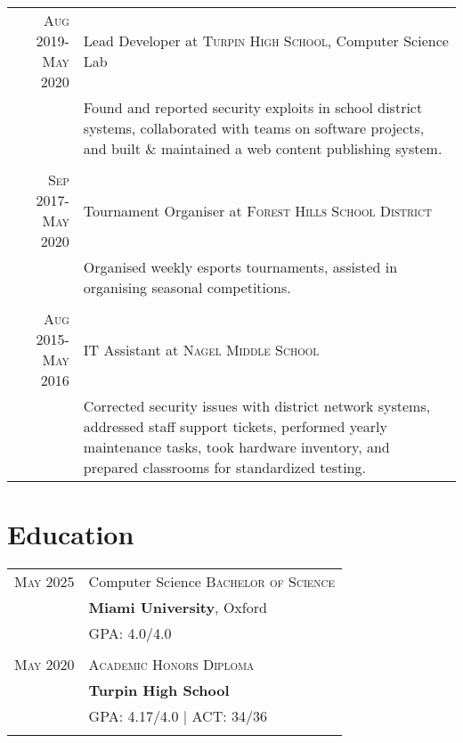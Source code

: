 \documentclass[a4paper,10pt]{article} %
\begin{document}
\begin{tabular}{r|p{11cm}}
\textsc{Aug 2019-May 2020} & Lead Developer at \textsc{Turpin High School}, Computer Science Lab \emph{}\\
& \footnotesize{Found and reported security exploits in school district systems, collaborated with teams on software projects, and built \& maintained a web content publishing system.}\\
\multicolumn{2}{c}{} \\


\textsc{Sep 2017-May 2020} & Tournament Organiser at \textsc{Forest Hills School District} \emph{}\\
& \footnotesize{Organised weekly esports tournaments, assisted in organising seasonal competitions.}\\
\multicolumn{2}{c}{} \\


\textsc{Aug 2015-May 2016} & IT Assistant at \textsc{Nagel Middle School} \emph{}\\
& \footnotesize{Corrected security issues with district network systems, addressed staff support tickets, performed yearly maintenance tasks, took hardware inventory, and prepared classrooms for standardized testing. }
\end{tabular}


\section{Education}

\begin{tabular}{rl}	
\textsc{May 2025} & Computer Science \textsc{}\textsc{Bachelor of Science}\\ &
\textbf{Miami University}, Oxford\\
&\normalsize \textsc{GPA}: 4.0/4.0 \\
&\\


\textsc{May 2020} & \textsc{}\textsc{Academic Honors Diploma}\\ &
\textbf{Turpin High School}\\
&\normalsize \textsc{GPA}: 4.17/4.0 {\hfill| \footnotesize \textsc{ACT}: 34/36}\\
&\\
\end{tabular}
\end{document}
